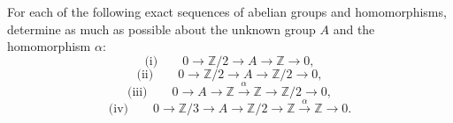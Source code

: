 \begin{problem}
For each of the following exact sequences of abelian groups and homomorphisms, determine as much as possible about the unknown group \(A\) and the homomorphism \(\alpha\):
\[
\text{(i)}\qquad 0 \longrightarrow \mathbb Z/2 \longrightarrow A \longrightarrow \mathbb Z \longrightarrow 0,
\]
\[
\text{(ii)}\qquad 0 \longrightarrow \mathbb Z/2 \longrightarrow A \longrightarrow \mathbb Z/2 \longrightarrow 0,
\]
\[
\text{(iii)}\qquad 0 \longrightarrow A \longrightarrow \mathbb Z \xrightarrow{\alpha} \mathbb Z \longrightarrow \mathbb Z/2 \longrightarrow 0,
\]
\[
\text{(iv)}\qquad 0 \longrightarrow \mathbb Z/3 \longrightarrow A \longrightarrow \mathbb Z/2 \longrightarrow \mathbb Z \xrightarrow{\alpha} \mathbb Z \longrightarrow 0.
\]
\end{problem}

